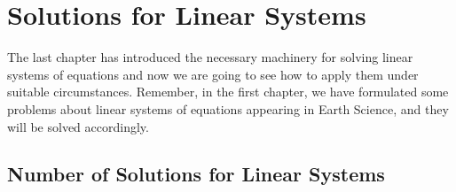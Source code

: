 \chapter{Solutions for Linear Systems}
\label{chap:SolLinSys}

The last chapter has introduced the necessary machinery for solving linear systems of equations and now we are going to see how to apply them under suitable circumstances. Remember, in the first chapter, we have formulated some problems about linear systems of equations appearing in Earth Science, and they will be solved accordingly.

\section{Number of Solutions for Linear Systems}
\label{section:NoSolLinSys}

